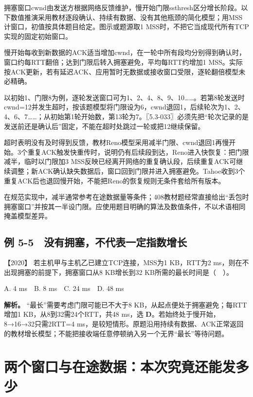 拥塞窗口cwnd由发送方根据网络反馈维护，慢开始门限ssthresh区分增长阶段。以下数值推演采用教材逐段确认、持续有数据、没有其他瓶颈的简化模型；用MSS计窗口，初值按具体题目给定。图示或题源取1 MSS时，不把它当成现代所有TCP实现的固定初始窗口。

慢开始每收到新数据的ACK适当增加cwnd，在一轮中所有段均分别得到确认时，窗口约每RTT翻倍；达到门限后转入拥塞避免，平均每RTT约增加1 MSS。实际按ACK更新，若有延迟ACK、应用暂时无数据或接收窗口受限，逐轮翻倍模型未必精确。

以初始1、门限8为例，逐轮发送窗口可为1、2、4、8、9、10\ldots\ldots。若第8轮发送时cwnd=12并发生超时，按该题模型将门限设为6，cwnd退回1，后续轮次为1、2、4、6、7\ldots\ldots；从初始第1轮开始数，第13轮为7。〖5.3-033〗必须先把``轮次记录的是发送前还是确认后''固定，不能在超时处跳过一轮或把12继续保留。

超时表明没有及时得到反馈，教材Reno模型采用减半门限、cwnd退回1再慢开始。3个重复ACK触发快重传时，说明仍有后续段到达，Reno进入快恢复：把门限减半，临时以门限加3 MSS反映已经离开网络的重复确认段，后续重复ACK可继续调整；新ACK确认缺失数据后，窗口回到门限并进入拥塞避免。Tahoe收到3个重复ACK后也退回慢开始，不能把Reno的恢复规则无条件套给所有版本。

在规范实现中，减半通常参考在途数据量等条件；408教材题经常直接给出``丢包时拥塞窗口''并按其一半设门限。应使用题目明确的算法及数值条件，不以术语相同掩盖模型差异。

\subsection{例 5-5　没有拥塞，不代表一定指数增长}\label{cn-ex5-5}

\noindent{}【2020】 若主机甲与主机乙已建立TCP连接，MSS为1 KB，RTT为2 ms，则在不出现拥塞的前提下，拥塞窗口从8 KB增长到32 KB所需的最长时间是（　）。

A. 4 ms　B. 8 ms　C. 24 ms　D. 48 ms


\textbf{解析。} ``最长''需要考虑门限可能已不大于8 KB，从起点便处于拥塞避免；每RTT增加1 KB，从8到32需24个RTT，共48 ms，选 \textbf{D}。若始终处于慢开始，8→16→32只需2RTT=4 ms，是较短情形。原题沿用持续有数据、ACK正常返回的教材增长模型；不能把接收端任意停顿纳入另一个无界``最长''等待问题。

\section{两个窗口与在途数据：本次究竟还能发多少}\label{cn-05-09}

